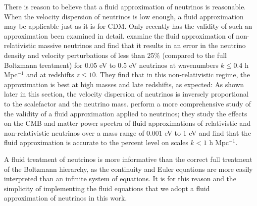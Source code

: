\documentclass{aastex}
\begin{document}
There is reason to believe that a fluid approximation of
neutrinos is reasonable. When the velocity dispersion of neutrinos is low enough, a
fluid approximation may be applicable just as it is for CDM. Only recently has the validity of such an approximation been
examined in detail.  \cite{shoji10} examine the fluid approximation
of non-relativistic massive neutrinos and find that it 
results in an error in the neutrino density and
velocity perturbations of less than 25\% (compared to the full
Boltzmann treatment) for 0.05 eV to 0.5 eV neutrinos  at wavenumbers $k \le 0.4$ h
Mpc$^{-1}$ and at
redshifts $z\le10$.  
They find that in this non-relativistic regime,
the approximation is best at high masses and late redshifts, as
expected: As shown later in this section, the velocity dispersion of neutrinos is inversely
proportional to the scalefactor and the neutrino mass. 
\cite{lesgourgues11} perform a more comprehensive study of the
validity of a fluid approximation applied to neutrinos; they study the
effects on the CMB and matter power spectra of 
fluid approximations of relativistic and non-relativistic neutrinos over a mass range of
0.001 eV to 1 eV and find
that the fluid approximation is accurate to the percent level on
scales $k<1$ h Mpc$^{-1}$.  



A fluid treatment of neutrinos is more
informative than the correct full treatment of the Boltzmann
hierarchy, as the continuity and Euler equations are more easily
interpreted than an infinite system of equations.  
It is for this reason and the simplicity of implementing the fluid
equations 
that we adopt a fluid approximation of
neutrinos in this work.  
\end{document}
